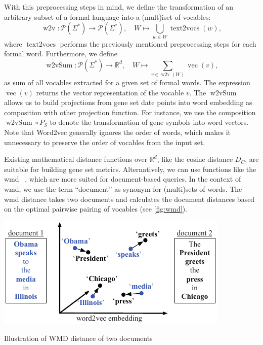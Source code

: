 \documentclass{thesisclass}
\DeclareMathOperator{\textToVocs}{text2vocs}
\DeclareMathOperator{\wToV}{w2v}
\DeclareMathOperator{\vecOp}{vec}
\DeclareMathOperator{\wToVSum}{w2vSum}
\begin{document}
With this preprocessing steps in mind, we define the transformation of an arbitrary subset of a formal language into a (mult)iset of vocables:
\begin{equation*}
		\wToV :  \mathcal{P}(\Sigma^*) \to \mathcal{P}(\Sigma^*), \quad W \mapsto \bigcup_{w \in W}  \textToVocs(w),
\end{equation*}
where $\textToVocs$ performs the previously mentioned preprocessing steps for each formal word. 
Furthermore, we define
\begin{equation*}
		\wToVSum :  \mathcal{P}(\Sigma^*) \to \mathbb{R}^d, \quad W \mapsto \sum_{v \in  \wToV(W)} \vecOp(v) ,
\end{equation*}
as sum of all vocables extracted for a given set of formal words. The expression $\vecOp(v)$ returns the vector representation of the vocable $v$. 
The $\wToVSum$ allows us to build projections from gene set date points into word embedding as composition with other projection function. 
For instance, we use the composition $\wToVSum \circ P_{S}$ to denote the transformation of gene symbols into word vectors. Note that Word2vec generally ignores the order of words, which makes it unnecessary to preserve the order of vocables from the input set.

Existing mathematical distance functions over $\mathbb{R}^d$, like the cosine distance $D_C$, are suitable for building gene set metrics. Alternatively, we can use functions like the \acrfull{wmd}~ \cite{Kusner:2015:WED:3045118.3045221}, which are more suited for document-based queries. 
In the context of \acrshort{wmd}, we use the term ``document'' as synonym for (multi)sets of words. 
The \acrshort{wmd} distance takes two documents and calculates the document distances based on the optimal pairwise pairing of vocables (see \cref{fig:wmd}).
\begin{centeredFigure}[!h]
	\includegraphics{figures/materials/wmd.pdf}
	\caption{Illustration of WMD distance of two documents~\cite{Kusner:2015:WED:3045118.3045221}}
	\label{fig:wmd}
\end{centeredFigure}
\end{document}
